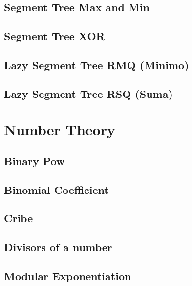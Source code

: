 \documentclass[twocolumn]{article}
\begin{document}
\subsection{Segment Tree Max and Min}
\raggedbottom
\hrulefill
\subsection{Segment Tree XOR}
\raggedbottom
\hrulefill
\subsection{Lazy Segment Tree RMQ (Minimo)}
\raggedbottom
\hrulefill
\subsection{Lazy Segment Tree RSQ (Suma)}
\raggedbottom
\hrulefill

\section{Number Theory}
\subsection{Binary Pow}
\raggedbottom
\hrulefill
\subsection{Binomial Coefficient}
\raggedbottom
\hrulefill
\subsection{Cribe}
\raggedbottom
\hrulefill
\subsection{Divisors of a number}
\raggedbottom
\hrulefill
\subsection{Modular Exponentiation}
\raggedbottom
\hrulefill
\end{document}
